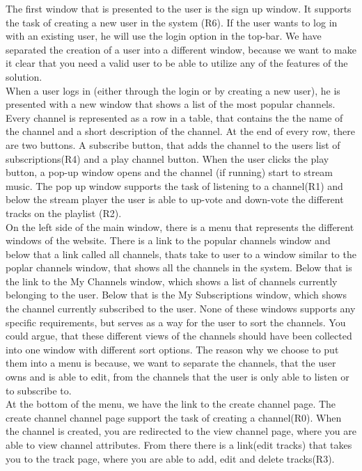 \documentclass[a4paper,11pt,report]{article}
\begin{document}
The first window that is presented to the user is the sign up window. It supports the task of creating a new user in the system (R6). If the user wants to log in with an existing user, he will use the login option in the top-bar. We have separated the creation of a user into a different window, because we want to make it clear that you need a valid user to be able to utilize any of the features of the solution.\\

When a user logs in (either through the login or by creating a new user), he is presented with a new window that shows a list of the most popular channels. Every channel is represented as a row in a table, that contains the the name of the channel and a short description of the channel. At the end of every row, there are two buttons. A subscribe button, that adds the channel to the users list of subscriptions(R4) and a play channel button. When the user clicks the play button, a pop-up window opens and the channel (if running) start to stream music. The pop up window supports the task of listening to a channel(R1) and below the stream player the user is able to up-vote and down-vote the different tracks on the playlist (R2).\\

On the left side of the main window, there is a menu that represents the different windows of the website. There is a link to the popular channels window and below that a link called all channels, thats take to user to a window similar to the poplar channels window, that shows all the channels in the system. Below that is the link to the My Channels window, which shows a list of channels currently belonging to the user. Below that is the My Subscriptions window, which shows the channel currently subscribed to the user. None of these windows supports any specific requirements, but serves as a way for the user to sort the channels. You could argue, that these different views of the channels should have been collected into one window with different sort options. The reason why we choose to put them into a menu is because, we want to separate the channels, that the user owns and is able to edit, from the channels that the user is only able to listen or to subscribe to.\\

At the bottom of the menu, we have the link to the create channel page. The create channel channel page support the task of creating a channel(R0). When the channel is created, you are redirected to the view channel page, where you are able to view channel attributes. From there there is a link(edit tracks) that takes you to the track page, where you are able to add, edit and delete tracks(R3).\\
\end{document}
